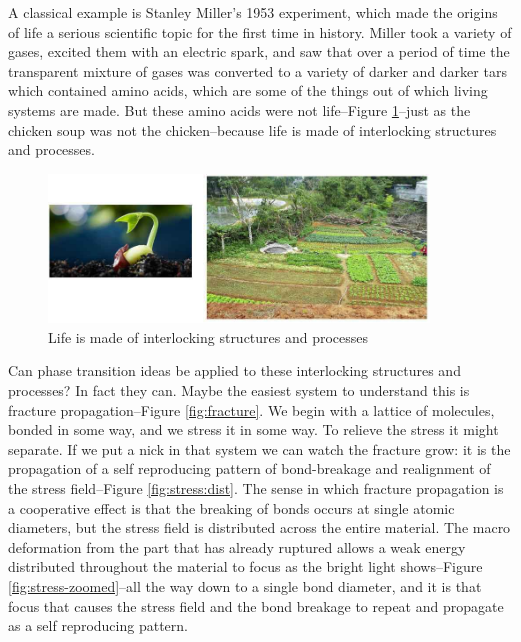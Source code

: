 \documentclass[]{article}
\begin{document}
A classical example is Stanley Miller's 1953 experiment\cite{miller1959organic}, which made the origins of life a serious scientific topic for the first time in history. Miller took a variety of gases, excited them with an electric spark, and saw that over a period of time the transparent mixture of gases was converted to a variety of darker and darker tars which contained amino acids, which are some of the things out of which living systems are made. But these amino acids were not life--Figure \ref{fig:life-interlocking}--just as the chicken soup was not the chicken--because life is made of interlocking structures and processes.

\begin{figure}[H]
	\caption{Life is made of interlocking structures and processes}\label{fig:life-interlocking}
	\includegraphics[width=0.9\textwidth]{life-interlocking}
\end{figure}

Can phase transition ideas be applied to these interlocking structures and processes? In fact they can. Maybe the easiest system to understand this is fracture propagation--Figure \ref{fig:fracture}. We begin with a lattice of molecules, bonded in some way, and we stress it in some way. To relieve the stress it might separate. If we put a nick in that system we can watch the fracture grow: it is the propagation of a self reproducing pattern of bond-breakage and realignment of the stress field--Figure \ref{fig:stress:dist}. The sense in which fracture propagation is a cooperative effect is that the breaking of bonds occurs at single atomic diameters, but the stress field is distributed across the entire material. The macro deformation from the part that has already ruptured allows a weak energy distributed throughout the material to focus as the bright light shows--Figure \ref{fig:stress-zoomed}--all the way down to a single bond diameter, and it is that focus that causes the stress field and the bond breakage to repeat and propagate as a self reproducing pattern.
\end{document}
